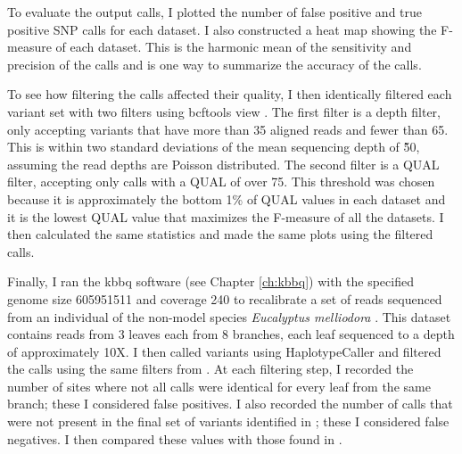 \documentclass{report}
\begin{document}
\begin{outline}
\item To evaluate the output calls, I plotted the number of false positive and true positive SNP calls for each dataset. I also constructed a heat map showing the F-measure of each dataset. This is the harmonic mean of the sensitivity and precision of the calls and is one way to summarize the accuracy of the calls.

\item To see how filtering the calls affected their quality, I then identically filtered each variant set with two filters using bcftools view \parencite{li_sequence_2009}. The first filter is a depth filter, only accepting variants that have more than 35 aligned reads and fewer than 65. This is within two standard deviations of the mean sequencing depth of \~50, assuming the read depths are Poisson distributed. The second filter is a QUAL filter, accepting only calls with a QUAL of over 75. This threshold was chosen because it is approximately the bottom 1\% of QUAL values in each dataset and it is the lowest QUAL value that maximizes the F-measure of all the datasets. I then calculated the same statistics and made the same plots using the filtered calls.


\item Finally, I ran the kbbq software (see Chapter \ref{ch:kbbq}) with the specified genome size 605951511 and coverage 240 to recalibrate a set of reads sequenced from an individual of the non-model species \textit{Eucalyptus melliodora} \parencite{orr_phylogenomic_2020}. This dataset contains reads from 3 leaves each from 8 branches, each leaf sequenced to a depth of approximately 10X. I then called variants using HaplotypeCaller and filtered the calls using the same filters from \cite{orr_phylogenomic_2020}. At each filtering step, I recorded the number of sites where not all calls were identical for every leaf from the same branch; these I considered false positives. I also recorded the number of calls that were not present in the final set of variants identified in \cite{orr_phylogenomic_2020}; these I considered false negatives. I then compared these values with those found in \cite{orr_phylogenomic_2020}.

\end{outline}
\end{document}
